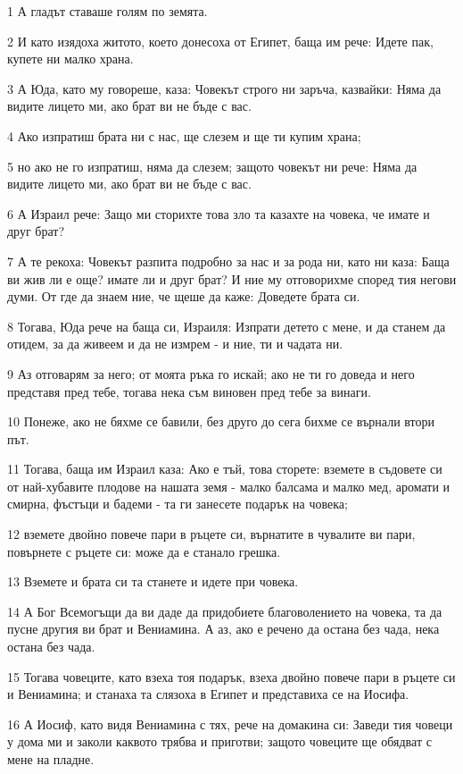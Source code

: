 \par 1 А гладът ставаше голям по земята.
\par 2 И като изядоха житото, което донесоха от Египет, баща им рече: Идете пак, купете ни малко храна.
\par 3 А Юда, като му говореше, каза: Човекът строго ни заръча, казвайки: Няма да видите лицето ми, ако брат ви не бъде с вас.
\par 4 Ако изпратиш брата ни с нас, ще слезем и ще ти купим храна;
\par 5 но ако не го изпратиш, няма да слезем; защото човекът ни рече: Няма да видите лицето ми, ако брат ви не бъде с вас.
\par 6 А Израил рече: Защо ми сторихте това зло та казахте на човека, че имате и друг брат?
\par 7 А те рекоха: Човекът разпита подробно за нас и за рода ни, като ни каза: Баща ви жив ли е още? имате ли и друг брат? И ние му отговорихме според тия негови думи. От где да знаем ние, че щеше да каже: Доведете брата си.
\par 8 Тогава, Юда рече на баща си, Израиля: Изпрати детето с мене, и да станем да отидем, за да живеем и да не измрем - и ние, ти и чадата ни.
\par 9 Аз отговарям за него; от моята ръка го искай; ако не ти го доведа и него представя пред тебе, тогава нека съм виновен пред тебе за винаги.
\par 10 Понеже, ако не бяхме се бавили, без друго до сега бихме се върнали втори път.
\par 11 Тогава, баща им Израил каза: Ако е тъй, това сторете: вземете в съдовете си от най-хубавите плодове на нашата земя - малко балсама и малко мед, аромати и смирна, фъстъци и бадеми - та ги занесете подарък на човека;
\par 12 вземете двойно повече пари в ръцете си, върнатите в чувалите ви пари, повърнете с ръцете си: може да е станало грешка.
\par 13 Вземете и брата си та станете и идете при човека.
\par 14 А Бог Всемогъщи да ви даде да придобиете благоволението на човека, та да пусне другия ви брат и Вениамина. А аз, ако е речено да остана без чада, нека остана без чада.
\par 15 Тогава човеците, като взеха тоя подарък, взеха двойно повече пари в ръцете си и Вениамина; и станаха та слязоха в Египет и представиха се на Иосифа.
\par 16 А Иосиф, като видя Вениамина с тях, рече на домакина си: Заведи тия човеци у дома ми и заколи каквото трябва и приготви; защото човеците ще обядват с мене на пладне.
